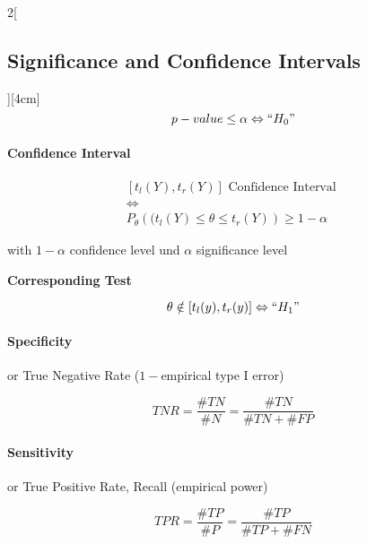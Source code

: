 \documentclass[8pt]{extarticle}
\begin{document}
\begin{multicols}{2}[\subsection{Significance and Confidence Intervals}][4cm]
$$p-value \leq \alpha \Leftrightarrow ``H_0"$$




\paragraph{Confidence Interval}
$$\begin{gathered}
\left[t_l(Y),t_r(Y)\right] \text{ Confidence Interval } \\
\Leftrightarrow \\
P_\theta\left((t_l(Y) {\leq} \theta {\leq} t_r(Y)\right) \geq 1{-}\alpha
\end{gathered}$$


\noindent with $1-\alpha$ confidence level und $\alpha$ significance level
\vspace{0.5em}

\textbf{Corresponding Test}

$$\theta \notin \left[t_l(y), t_r(y)\right] \Leftrightarrow ``H_1"$$



\paragraph{Specificity}  or True Negative Rate ($1 -$empirical type I error)

$$TNR = \frac{\#TN}{\#N} = \frac{\#TN}{\#TN + \#FP}$$

\paragraph{Sensitivity}  or True Positive Rate, Recall (empirical power)

$$TPR = \frac{\#TP}{\#P} = \frac{\#TP}{\#TP + \#FN}$$

\end{multicols}
\end{document}

